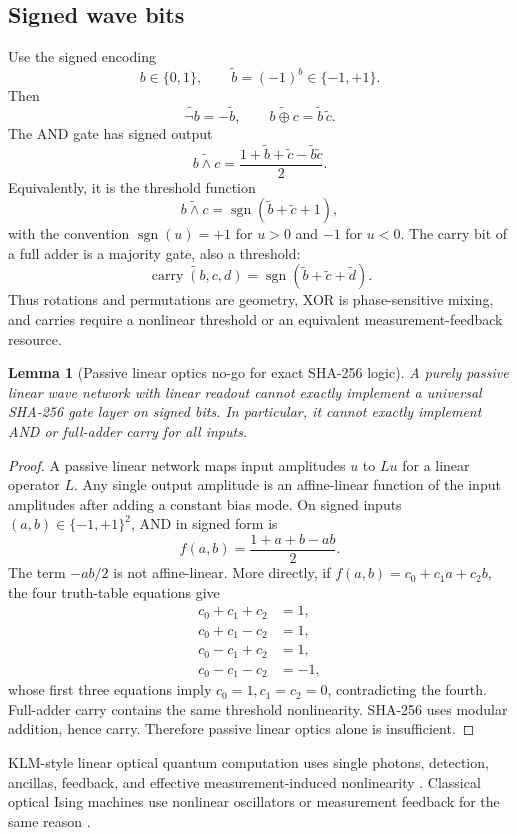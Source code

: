 \documentclass[11pt]{article}
\newtheorem{lemma}[theorem]{Lemma}
\theoremstyle{definition}
\theoremstyle{remark}
\newcommand{\bits}{\{0,1\}}
\newcommand{\pmone}{\{-1,+1\}}
\newcommand{\sgn}{\operatorname{sgn}}
\begin{document}
\subsection{Signed wave bits}

Use the signed encoding
\[
b\in\bits,\qquad \tilde b=(-1)^b\in\pmone.
\]
Then
\[
\widetilde{\neg b}=-\tilde b,\qquad
\widetilde{b\oplus c}=\tilde b\,\tilde c.
\]
The AND gate has signed output
\[
\widetilde{b\wedge c}
=\frac{1+\tilde b+\tilde c-\tilde b\tilde c}{2}.
\]
Equivalently, it is the threshold function
\[
\widetilde{b\wedge c}
=\sgn(\tilde b+\tilde c+1),
\]
with the convention \(\sgn(u)=+1\) for \(u>0\) and \(-1\) for \(u<0\). The carry
bit of a full adder is a majority gate, also a threshold:
\[
\widetilde{\operatorname{carry}(b,c,d)}
=\sgn(\tilde b+\tilde c+\tilde d).
\]
Thus rotations and permutations are geometry, XOR is phase-sensitive mixing,
and carries require a nonlinear threshold or an equivalent measurement-feedback
resource.

\begin{lemma}[Passive linear optics no-go for exact SHA-256 logic]
\label{lem:linearno}
A purely passive linear wave network with linear readout cannot exactly
implement a universal SHA-256 gate layer on signed bits. In particular, it
cannot exactly implement AND or full-adder carry for all inputs.
\end{lemma}

\begin{proof}
A passive linear network maps input amplitudes \(u\) to \(Lu\) for a linear
operator \(L\). Any single output amplitude is an affine-linear function of the
input amplitudes after adding a constant bias mode. On signed inputs
\((a,b)\in\pmone^2\), AND in signed form is
\[
f(a,b)=\frac{1+a+b-ab}{2}.
\]
The term \(-ab/2\) is not affine-linear. More directly, if
\(f(a,b)=c_0+c_1a+c_2b\), the four truth-table equations give
\[
\begin{aligned}
c_0+c_1+c_2&=1,\\
c_0+c_1-c_2&=1,\\
c_0-c_1+c_2&=1,\\
c_0-c_1-c_2&=-1,
\end{aligned}
\]
whose first three equations imply \(c_0=1,c_1=c_2=0\), contradicting the fourth.
Full-adder carry contains the same threshold nonlinearity. SHA-256 uses modular
addition, hence carry. Therefore passive linear optics alone is insufficient.
\end{proof}

KLM-style linear optical quantum computation uses single photons, detection,
ancillas, feedback, and effective measurement-induced nonlinearity
\cite{KLM2001}. Classical optical Ising machines use nonlinear oscillators or
measurement feedback for the same reason \cite{Yamamoto2017,CIM100k2021}.
\end{document}
